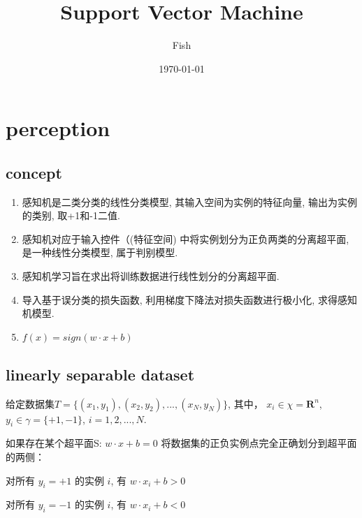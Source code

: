\documentclass[oneside, 12pt]{ctexbook}
\title{\kaishu Support Vector Machine}
\author{Fish}
\date{\today}
\begin{document}
	\maketitle
	\cleardoublepage
	\thispagestyle{empty}
	\renewcommand{\contentsname}{Content} %
	\tableofcontents
	\thispagestyle{plain}
	
	\clearpage
	\pagestyle{fancy}
	\setcounter{page}{1}
	
	\chapter{\quad perception}
		\thispagestyle{fancy}
		\section{\quad concept}
			\begin{enumerate}
				\item 感知机是二类分类的线性分类模型, 其输入空间为实例的特征向量, 输出为实例的类别, 取+1和-1二值.
				
				\item 感知机对应于输入控件（(特征空间) 中将实例划分为正负两类的分离超平面, 是一种线性分类模型, 属于判别模型. 
				
				\item 感知机学习旨在求出将训练数据进行线性划分的分离超平面.
				
				\item 导入基于误分类的损失函数, 利用梯度下降法对损失函数进行极小化, 求得感知机模型.
				
				\item $f(x) = sign(w \cdot x + b)$
			\end{enumerate}
		
		\section{\quad linearly separable dataset}
			给定数据集$T = \{ (x_1, y_1), (x_2, y_2), ..., (x_N, y_N)\}$,
			其中， $x_i \in \chi = \boldsymbol{\text{R}}^n$, $y_i \in \gamma = \{ +1, -1\}$, $ i = 1,2,...,N$.
			
			如果存在某个超平面S: $w \cdot x + b = 0$ 
			将数据集的正负实例点完全正确划分到超平面的两侧：
			
			对所有 $y_i = +1$ 的实例 $i$, 有 $w \cdot x_i + b > 0$
			
			对所有 $y_i = -1$ 的实例 $i$, 有 $w \cdot x_i + b < 0$
			
\end{document}
